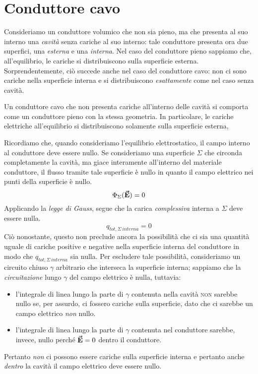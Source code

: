 \section{Conduttore cavo}
Consideriamo un conduttore volumico che non sia pieno, ma che presenta al suo interno una \textit{cavità} senza cariche al suo interno: tale conduttore presenta ora due superfici, una \textit{esterna} e una \textit{interna}. Nel caso del conduttore pieno sappiamo che, all'equilibrio, le cariche si distribuiscono sulla superficie esterna.\\
Sorprendentemente, ciò succede anche nel caso del conduttore cavo: non ci sono cariche nella superficie interna e si distribuiscono \textit{esattamente} come nel caso senza cavità.
\begin{proposition}
	Un conduttore cavo che non presenta cariche all'interno delle cavità si comporta come un conduttore pieno con la stessa geometria. In particolare, le cariche elettriche all'equilibrio si distribuiscono solamente sulla superficie esterna,
\end{proposition}
\begin{demonstration}
	Ricordiamo che, quando consideriamo l'equilibrio elettrostatico, il campo interno al conduttore deve essere nullo. Se consideriamo una superficie $\Sigma$ che circonda completamente la cavità, ma giace interamente all'interno del materiale conduttore, il flusso tramite tale superficie è nullo in quanto il campo elettrico nei punti della superficie è nullo.
	\begin{equation*}
		\Phi_{\Sigma}(\vb*{\va{E}})=0
	\end{equation*}
Applicando la \textit{legge di Gauss}, segue che la carica \textit{complessiva} interna a $\Sigma$ deve essere nulla.
\begin{equation}
	q_{tot,\Sigma\ interna}=0
\end{equation}
Ciò nonostante, questo non preclude ancora la possibilità che ci sia una quantità uguale di cariche positive e negative nella superficie interna del conduttore in modo che	$q_{tot,\Sigma\ interna}$ sia nulla. Per escludere tale possibilità, consideriamo un circuito chiuso $\gamma$ arbitrario che interseca la superficie interna; sappiamo che la \textit{circuitazione} lungo $\gamma$ del campo elettrico è nulla, tuttavia:
\begin{itemize}
	\item l'integrale di linea lungo la parte di $\gamma$ contenuta nella cavità \textsc{non} sarebbe nullo se, per assurdo, ci fossero cariche sulla superficie, dato che ci sarebbe un campo elettrico \textit{non} nullo.
	\item l'integrale di linea lungo la parte di $\gamma$ contenuta nel conduttore sarebbe, invece, nullo perché $\vb*{\va{E}}=0$ dentro il conduttore.
\end{itemize}
Pertanto \textit{non} ci possono essere cariche sulla superficie interna e pertanto anche \textit{dentro} la cavità il campo elettrico deve essere nullo.
\end{demonstration}

